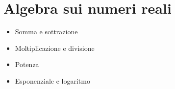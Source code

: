 \documentclass[letterpaper,10pt,english]{jupyterBook}
\begin{document}
\chapter{Algebra sui numeri reali}
\label{\detokenize{ch/algebra/real-algebra:algebra-sui-numeri-reali}}\label{\detokenize{ch/algebra/real-algebra:math-hs-algebra-real}}\label{\detokenize{ch/algebra/real-algebra::doc}}
\sphinxAtStartPar
{}

\sphinxAtStartPar
{}
\begin{itemize}
\item {} 
\sphinxAtStartPar
Somma e sottrazione

\item {} 
\sphinxAtStartPar
Moltiplicazione e divisione

\item {} 
\sphinxAtStartPar
Potenza

\item {} 
\sphinxAtStartPar
Esponenziale e logaritmo

\end{itemize}

\sphinxAtStartPar
{}

\sphinxstepscope
\end{document}
